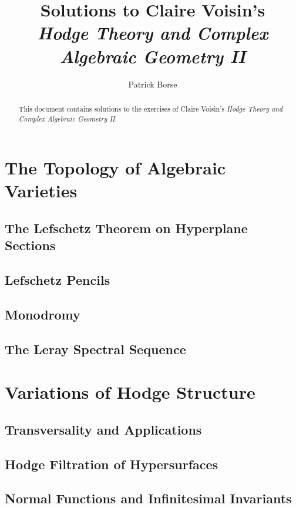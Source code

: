\documentclass[oneside]{amsbook}
\title{Solutions to Claire Voisin's\\ \emph{Hodge Theory and Complex Algebraic Geometry II}}
\author{Patrick Borse}
\begin{document}
\begin{abstract}
This document contains solutions to the exercises of Claire Voisin's \emph{Hodge Theory and Complex Algebraic Geometry II}.
\end{abstract}

\maketitle

\tableofcontents

\part{The Topology of Algebraic Varieties}
\chapter{The Lefschetz Theorem on Hyperplane Sections}


\chapter{Lefschetz Pencils}


\chapter{Monodromy}


\chapter{The Leray Spectral Sequence}


\part{Variations of Hodge Structure}
\chapter{Transversality and Applications}


\chapter{Hodge Filtration of Hypersurfaces}


\chapter{Normal Functions and Infinitesimal Invariants}

\end{document}
